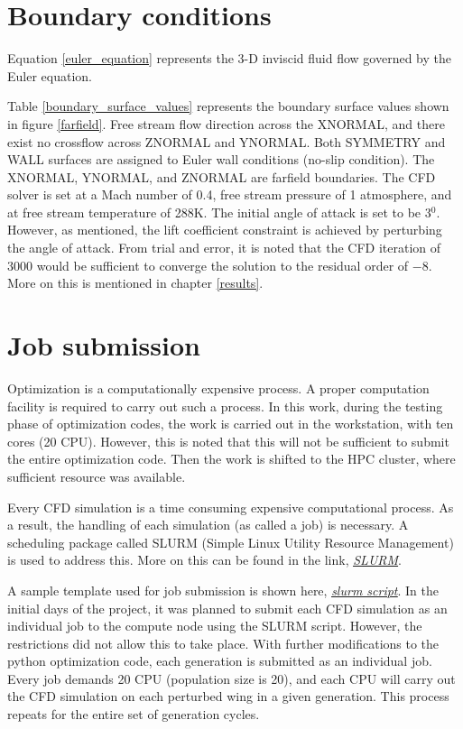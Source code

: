 \section{Boundary conditions}
Equation \ref{euler_equation} represents the 3-D inviscid fluid flow governed by the Euler equation.


Table \ref{boundary_surface_values} represents the boundary surface values shown in figure \ref{farfield}. Free stream flow direction across the XNORMAL, and there exist no crossflow across ZNORMAL and YNORMAL. Both SYMMETRY and WALL surfaces are assigned to Euler wall conditions (no-slip condition). The XNORMAL, YNORMAL, and ZNORMAL are farfield boundaries. The CFD solver is set at a Mach number of 0.4, free stream pressure of 1 atmosphere, and at free stream temperature of 288K. The initial angle of attack is set to be 3$^0$. However, as mentioned, the lift coefficient constraint is achieved by perturbing the angle of attack. From trial and error, it is noted that the CFD iteration of 3000 would be sufficient to converge the solution to the residual order of $-8$. More on this is mentioned in chapter \ref{results}.

\section{Job submission}
Optimization is a computationally expensive process. A proper computation facility is required to carry out such a process. In this work, during the testing phase of optimization codes, the work is carried out in the workstation, with ten cores (20 CPU). However, this is noted that this will not be sufficient to submit the entire optimization code. Then the work is shifted to the HPC cluster, where sufficient resource was available.

Every CFD simulation is a time consuming expensive computational process. As a result, the handling of each simulation (as called a job) is necessary.  A scheduling package called SLURM (Simple Linux Utility Resource Management) is used to address this. More on this can be found in the link, \href{https://slurm.schedmd.com/overview.html}{\textit{\underline{SLURM}}}.

A sample template used for job submission is shown here, \href{https://github.com/neelu065/M-Tech_project_code/blob/master/Project_code_fNRAND1/optimizer_input/submit_jobs.sh}{\underline{\textit{slurm script}}}. In the initial days of the project, it was planned to submit each CFD simulation as an individual job to the compute node using the SLURM script. However, the restrictions did not allow this to take place. With further modifications to the python optimization code, each generation is submitted as an individual job. Every job demands 20 CPU (population size is 20), and each CPU will carry out the CFD simulation on each perturbed wing in a given generation. This process repeats for the entire set of generation cycles. 

